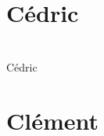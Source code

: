\documentclass[titlepage, 13px, a4paper]{report}
\begin{document}
\newpage





\section{Cédric}
\paragraph{} \hspace{0pt} \\
Cédric


\newpage





\section{Clément}
\end{document}
